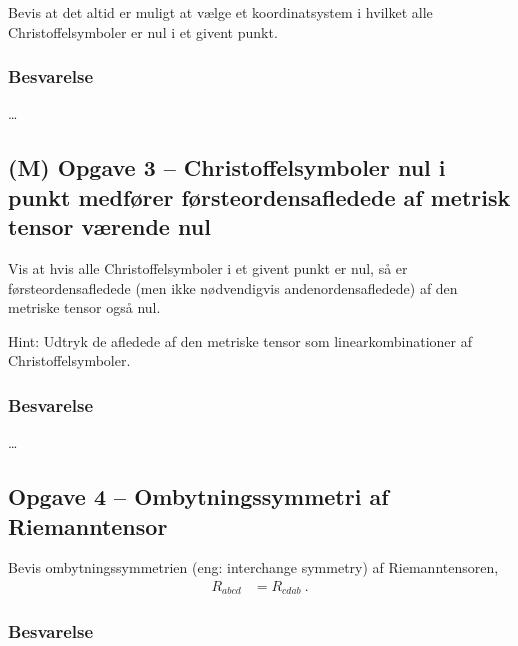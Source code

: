 \documentclass[../main.tex]{subfiles}
\begin{document}
Bevis at det altid er muligt at vælge et koordinatsystem i hvilket alle Christoffelsymboler er nul i et givent punkt.


\subsubsection{Besvarelse}

\ldots




\subsection{(M) Opgave 3 -- Christoffelsymboler nul i punkt medfører førsteordensafledede af metrisk tensor værende nul}
\setcounter{subsection}{3}
\setcounter{equation}{0}

Vis at hvis alle Christoffelsymboler i et givent punkt er nul, så er førsteordensafledede (men ikke nødvendigvis andenordensafledede) af den metriske tensor også nul.

Hint: Udtryk de afledede af den metriske tensor som linearkombinationer af Christoffelsymboler.


\subsubsection{Besvarelse}

\ldots




\subsection{Opgave 4 -- Ombytningssymmetri af Riemanntensor}
\setcounter{subsection}{4}
\setcounter{equation}{0}

Bevis ombytningssymmetrien (eng: interchange symmetry) af Riemanntensoren,
\begin{align}
    R_{abcd} &= R_{cdab} \: .
\end{align}


\subsubsection*{Besvarelse}
\end{document}
